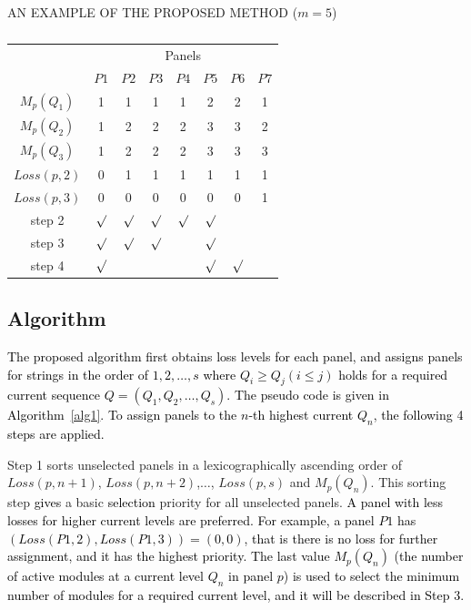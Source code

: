 \documentclass[conference]{pvsctran}
\newcommand{\michiko}{\textcolor{black}}
\begin{document}
\begin{table}[t]
  \caption{}
  \centerline{AN EXAMPLE OF THE PROPOSED METHOD ($ m = 5$)}
  \vskip5pt
\begin{center}
\begin{tabular}{c|c|ccccc|c}\hline \hline
                               & \multicolumn{7}{c}{Panels}  \\
                               &  \multicolumn{1}{c}{$P1$}    & $P2$   & $P3$    & $P4$    & $P5$   & \multicolumn{1}{c}{$P6$}            & $P7$             \\ \hline
$M_{p}(Q_1)$        & 1     & 1     & 1     & 1     & 2    & 2    & 1              \\ \hline
$M_{p}(Q_2)$        & 1     & 2     & 2     & 2     & 3    & 3    & 2              \\ \hline
$M_{p}(Q_3)$        & 1     & 2     & 2     & 2     & 3    & 3    & 3              \\ \hline
$Loss(p,2)$           & 0     & 1     & 1     & 1     & 1    & 1    & 1    \\ \hline
$Loss(p,3)$           & 0     & 0     & 0     & 0     & 0    & 0    & 1    \\ \hline\hline
step 2        & $\surd$ & $\surd$ &$\surd$ &$\surd$ &$\surd$ & & \\ \hline
step 3      & $\surd$ & $\surd$ &$\surd$ & &$\surd$ & & \\ \hline
step 4       & $\surd$ &  & & &$\surd$ & $\surd$ & \\ \hline         
\end{tabular}
\end{center}
\label{tab:proposed-example}
\end{table}

\subsection{Algorithm}
\michiko{The proposed algorithm first obtains loss levels for each panel, and assigns panels for strings in the order of $1,2,\ldots ,s$ where $Q_{i} \geq Q_{j} (i \leq j)$ holds for a required current sequence $Q = (Q_{1},Q_{2},\ldots ,Q_{s})$. The pseudo code is given in Algorithm~\ref{alg1}.
To assign panels to the $n$-th highest current $Q_{n}$, the following 4 steps are applied.}

Step 1 sorts unselected panels in a lexicographically ascending order of $Loss(p,n+1)$, $Loss(p,n+2)$,$\ldots$, $Loss(p,s)$ and $M_{p}(Q_{n})$.
This sorting step \michiko{gives} a basic \michiko{selection} priority for all unselected panels. 
\michiko{A panel with less losses for higher current levels are preferred. For example, a panel $P1$ has $(Loss(P1,2), Loss(P1,3)) = (0,0)$, that is there is no loss for further assignment, and it has the highest priority. The last value $M_{p}(Q_{n})$ (the number of active modules at a current level $Q_{n}$ in panel $p$) is used to select the minimum number of modules for a required current level, and it will be described in Step 3.}
\end{document}
